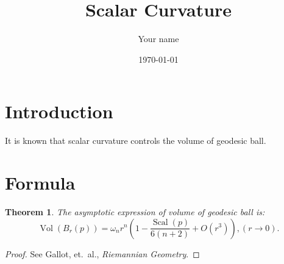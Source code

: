 \documentclass{article}
\title{Scalar Curvature}
\author{Your name}
\date{\today}
\theoremstyle{plain}
\newtheorem{theorem}{Theorem}
\begin{document}
\maketitle
\section{Introduction}
It is known that scalar curvature controls the volume of geodesic ball.

\section{Formula}
\begin{theorem}
    The asymptotic expression of volume of geodesic ball is:
    \[\operatorname{Vol}(B_r(p))=\omega_nr^n\left(1-\frac{\operatorname{Scal}(p)}{6(n+2)}+O(r^3)\right),(r\to 0).\]
\end{theorem}
\begin{proof}
    See Gallot, et.\ al., \emph{Riemannian Geometry}.
\end{proof}
\end{document}
